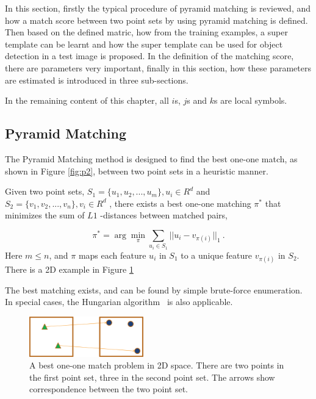 \documentclass[paper]{ieice}
\begin{document}
\label{dt5}
In this section, firstly the typical procedure of pyramid matching is reviewed, and how a match score between two point sets by using pyramid matching is defined. Then based on the defined matric, how from the training examples, a super template can be learnt and how the super template can be used for object detection in a test image is proposed. In the definition of the matching score, there are parameters very important, finally in this section, how these parameters are estimated is introduced in three sub-sections.

In the remaining content of this chapter, all $i$s, $j$s and $k$s are local symbols.
\subsection{Pyramid Matching}



The Pyramid Matching method is designed to find the best one-one match, as shown in Figure \ref{fig:p2}, between two point sets in a heuristic manner.

Given two point sets, ${S_1} = \{ {u_1},{u_2},...,{u_m}\}, u_i \in {R^d}
$
 and ${S_2} = \{ {v_1},{v_2},...,{v_n}\}, v_i \in {R^d}$
, there exists a best one-one matching ${\pi}^*$ that minimizes the sum of $L1$
-distances between matched pairs,

\[
{\pi ^*} = \arg \mathop {\min }\limits_\pi  \sum\limits_{{u_i} \in {S_1}} {||{u_i} - {v_{\pi (i)}}|{|_1}} \ .
\]
Here $m  \le n$, and $\pi$ maps each feature $u_i$ in $S_1$ to a unique feature ${{v_{\pi (i)}}}
$ in $S_2$. There is a 2D example in Figure \ref{fig:pms1}

The best matching exists, and can be found by simple brute-force enumeration. In special cases, the Hungarian algorithm~\cite{ha} is also applicable.

\begin{figure}
\centering
\includegraphics[width=0.44\textwidth]{pms1.eps}
\caption[Best one-one match]{A best one-one match problem in 2D space. There are two points in the first point set, three in the second point set. The arrows show correspondence between the two point set.}
\label{fig:pms1}
\end{figure}
\end{document}
